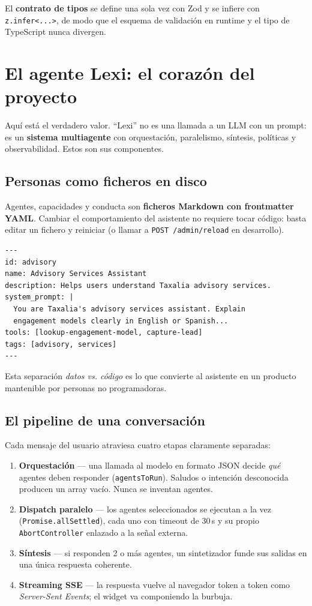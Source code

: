 \documentclass[11pt,a4paper]{article}
\newcommand{\code}[1]{\texttt{\small #1}}
\begin{document}
El \textbf{contrato de tipos} se define una sola vez con Zod y se infiere con
\code{z.infer<...>}, de modo que el esquema de validación en runtime y el tipo
de TypeScript nunca divergen.

\section{El agente Lexi: el corazón del proyecto}

Aquí está el verdadero valor. ``Lexi'' no es una llamada a un LLM con un
prompt: es un \textbf{sistema multiagente} con orquestación, paralelismo,
síntesis, políticas y observabilidad. Estos son sus componentes.

\subsection{Personas como ficheros en disco}

Agentes, capacidades y conducta son \textbf{ficheros Markdown con frontmatter
YAML}. Cambiar el comportamiento del asistente no requiere tocar código:
basta editar un fichero y reiniciar (o llamar a \code{POST /admin/reload} en
desarrollo).

\begin{lstlisting}
---
id: advisory
name: Advisory Services Assistant
description: Helps users understand Taxalia advisory services.
system_prompt: |
  You are Taxalia's advisory services assistant. Explain
  engagement models clearly in English or Spanish...
tools: [lookup-engagement-model, capture-lead]
tags: [advisory, services]
---
\end{lstlisting}

Esta separación \emph{datos vs. código} es lo que convierte al asistente en un
producto mantenible por personas no programadoras.

\subsection{El pipeline de una conversación}

Cada mensaje del usuario atraviesa cuatro etapas claramente separadas:

\begin{enumerate}[label=\textbf{\arabic*.}]
\item \textbf{Orquestación} — una llamada al modelo en formato JSON decide
\emph{qué} agentes deben responder (\code{agentsToRun}). Saludos o intención
desconocida producen un array vacío. Nunca se inventan agentes.
\item \textbf{Dispatch paralelo} — los agentes seleccionados se ejecutan a la
vez (\code{Promise.allSettled}), cada uno con timeout de 30\,s y su propio
\code{AbortController} enlazado a la señal externa.
\item \textbf{Síntesis} — si responden 2 o más agentes, un sintetizador funde
sus salidas en una única respuesta coherente.
\item \textbf{Streaming SSE} — la respuesta vuelve al navegador token a token
como \emph{Server-Sent Events}; el widget va componiendo la burbuja.
\end{enumerate}
\end{document}
